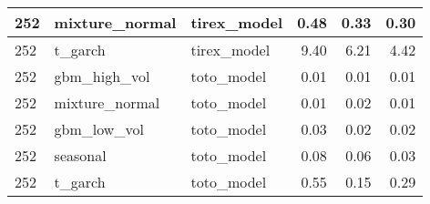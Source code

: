 {\begin{tabular}{lllrrr}
\midrule
252 & mixture\_normal & tirex\_model & 0.48 & 0.33 & 0.30 \\
\midrule
252 & t\_garch & tirex\_model & 9.40 & 6.21 & 4.42 \\
\midrule
252 & gbm\_high\_vol & toto\_model & 0.01 & 0.01 & 0.01 \\
\midrule
252 & mixture\_normal & toto\_model & 0.01 & 0.02 & 0.01 \\
\midrule
252 & gbm\_low\_vol & toto\_model & 0.03 & 0.02 & 0.02 \\
\midrule
252 & seasonal & toto\_model & 0.08 & 0.06 & 0.03 \\
\midrule
252 & t\_garch & toto\_model & 0.55 & 0.15 & 0.29 \\
\bottomrule
\end{tabular}
}